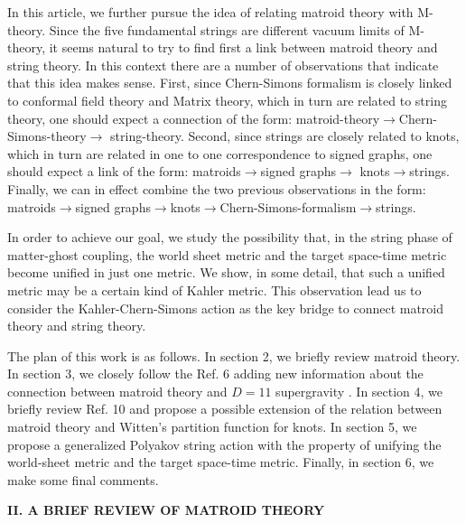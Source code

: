 \documentclass[a4paper,12pt]{article}
\begin{document}
In this article, we further pursue the idea of relating matroid theory with
M-theory. Since the five fundamental strings are different vacuum limits of
M-theory, it seems natural to try to find first a link between matroid
theory and string theory. In this context there are a number of observations
that indicate that this idea makes sense. First, since Chern-Simons
formalism is closely linked to conformal field theory and Matrix theory,
which in turn are related to string theory, one should expect a connection
of the form: matroid-theory$\rightarrow $Chern-Simons-theory$\rightarrow $%
string-theory. Second, since strings are closely related to knots, which in
turn are related in one to one correspondence to signed graphs, one should
expect a link of the form: matroids$\rightarrow $signed graphs$\rightarrow $%
knots$\rightarrow $strings. Finally, we can in effect combine the two
previous observations in the form: matroids$\rightarrow $signed graphs$%
\rightarrow $knots$\rightarrow $Chern-Simons-formalism$\rightarrow $strings.

In order to achieve our goal, we study the possibility that, in the string
phase of matter-ghost coupling, the world sheet metric and the target
space-time metric become unified in just one metric. We show, in some
detail, that such a unified metric may be a certain kind of Kahler metric.
This observation lead us to consider the Kahler-Chern-Simons action as the
key bridge to connect matroid theory and string theory.

The plan of this work is as follows. In section 2, we briefly review matroid
theory. In section 3, we closely follow the Ref. 6 adding new information
about the connection between matroid theory and $D=11$ supergravity . In
section 4, we briefly review Ref. 10 and propose a possible extension of the
relation between matroid theory and Witten's partition function for knots.
In section 5, we propose a generalized Polyakov string action with the
property of unifying the world-sheet metric and the target space-time
metric. Finally, in section 6, we make some final comments. 
\bigskip

\smallskip

\noindent \textbf{II. A BRIEF REVIEW OF MATROID THEORY}

\bigskip
\end{document}
